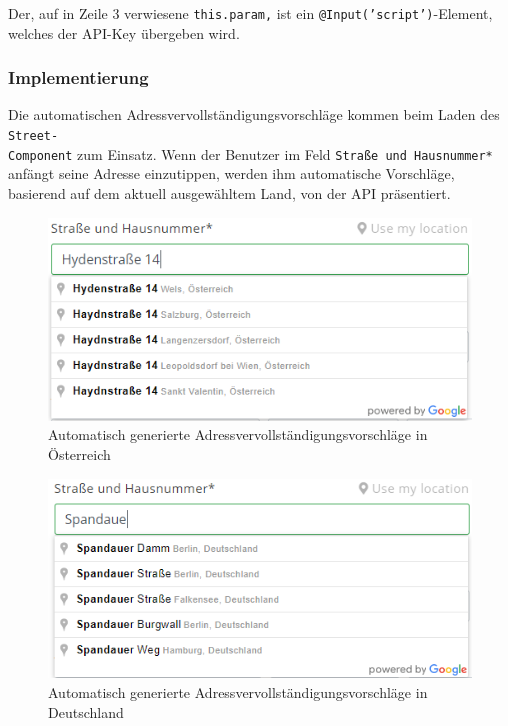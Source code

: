 Der, auf in Zeile 3 verwiesene \texttt{this.param,} ist ein \texttt{@Input('script')}-Element, welches der API-Key übergeben wird. 

\subsubsection{Implementierung}
Die automatischen Adressvervollständigungsvorschläge kommen beim Laden des \texttt{Street-\\Component} zum Einsatz. Wenn der Benutzer im Feld \texttt{Straße und Hausnummer*} anfängt seine Adresse einzutippen, werden ihm automatische Vorschläge, basierend auf dem aktuell ausgewähltem Land, von der API präsentiert. 

\begin{figure}[H]
	\centerline{
		\includegraphics[width=1\textwidth, frame]{./grafiken/open_adress_completion.PNG}
	}
	\vskip0pt
	\caption{Automatisch generierte Adressvervollständigungsvorschläge in Österreich}
\end{figure}

\begin{figure}[H]
	\centerline{
		\includegraphics[width=1\textwidth, frame]{./grafiken/open_adress_completion_de.PNG}
	}
	\vskip0pt
	\caption{Automatisch generierte Adressvervollständigungsvorschläge in Deutschland}
\end{figure}

